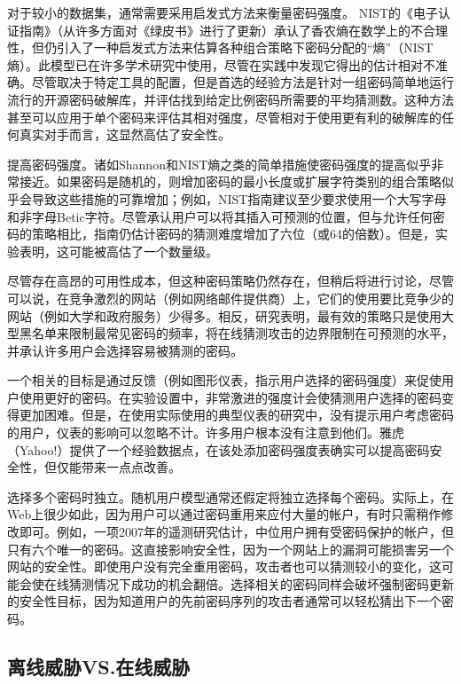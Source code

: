 对于较小的数据集，通常需要采用启发式方法来衡量密码强度。 NIST的《电子认证指南》（从许多方面对《绿皮书》进行了更新）承认了香农熵在数学上的不合理性，但仍引入了一种启发式方法来估算各种组合策略下密码分配的“熵”（NIST熵）。此模型已在许多学术研究中使用，尽管在实践中发现它得出的估计相对不准确。尽管取决于特定工具的配置，但是首选的经验方法是针对一组密码简单地运行流行的开源密码破解库，并评估找到给定比例密码所需要的平均猜测数。这种方法甚至可以应用于单个密码来评估其相对强度，尽管相对于使用更有利的破解库的任何真实对手而言，这显然高估了安全性。

提高密码强度。诸如Shannon和NIST熵之类的简单措施使密码强度的提高似乎非常接近。如果密码是随机的，则增加密码的最小长度或扩展字符类别的组合策略似乎会导致这些措施的可靠增加；例如，NIST指南建议至少要求使用一个大写字母和非字母Betic字符。尽管承认用户可以将其插入可预测的位置，但与允许任何密码的策略相比，指南仍估计密码的猜测难度增加了六位（或64的倍数）。但是，实验表明，这可能被高估了一个数量级。

尽管存在高昂的可用性成本，但这种密码策略仍然存在，但稍后将进行讨论，尽管可以说，在竞争激烈的网站（例如网络邮件提供商）上，它们的使用要比竞争少的网站（例如大学和政府服务）少得多。相反，研究表明，最有效的策略只是使用大型黑名单来限制最常见密码的频率，将在线猜测攻击的边界限制在可预测的水平，并承认许多用户会选择容易被猜测的密码。

一个相关的目标是通过反馈（例如图形仪表，指示用户选择的密码强度）来促使用户使用更好的密码。在实验设置中，非常激进的强度计会使猜测用户选择的密码变得更加困难。但是，在使用实际使用的典型仪表的研究中，没有提示用户考虑密码的用户，仪表的影响可以忽略不计。许多用户根本没有注意到他们。雅虎（Yahoo!）提供了一个经验数据点，在该处添加密码强度表确实可以提高密码安全性，但仅能带来一点点改善。

选择多个密码时独立。随机用户模型通常还假定将独立选择每个密码。实际上，在Web上很少如此，因为用户可以通过密码重用来应付大量的帐户，有时只需稍作修改即可。例如，一项2007年的遥测研究估计，中位用户拥有受密码保护的帐户，但只有六个唯一的密码。这直接影响安全性，因为一个网站上的漏洞可能损害另一个网站的安全性。即使用户没有完全重用密码，攻击者也可以猜测较小的变化，这可能会使在线猜测情况下成功的机会翻倍。选择相关的密码同样会破坏强制密码更新的安全性目标，因为知道用户的先前密码序列的攻击者通常可以轻松猜出下一个密码。

\subsection{离线威胁VS.在线威胁}


